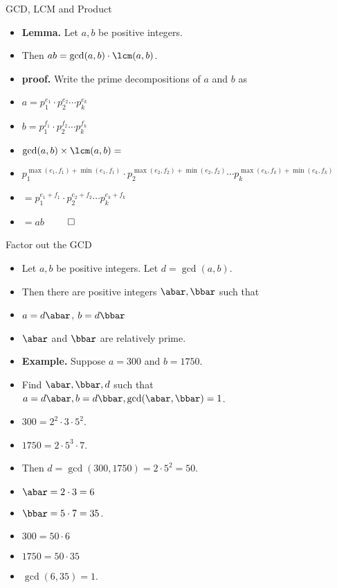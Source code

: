 \documentclass[handout]{beamer}
\begin{document}
\begin{frame}{GCD, LCM and Product}

\begin{itemize}
  \item \textbf{Lemma.} Let $a,b$ be positive integers.
  \item Then $ab = \gcd(a,b) \cdot \lcm(a,b)$.
  \item \textbf{proof.} Write the prime decompositions of $a$ and $b$ as
  \item $a=p_1^{e_1} \cdot p_2^{e_2} \cdots p_k^{e_k}$
  \item $b=p_1^{f_1} \cdot p_2^{f_2} \cdots p_k^{f_k}$
  \item $\gcd(a,b)\times \lcm(a,b) =$
  \item $p_1^{\max(e_1,f_1)+\min(e_1,f_1)} \cdot p_2^{\max(e_2,f_2)+\min(e_2,f_2)} \cdots p_k^{\max(e_k,f_k)+\min(e_k,f_k)}$
  \item $=p_1^{e_1+f_1} \cdot p_2^{e_2+f_2} \cdots p_k^{e_k+f_k}$
  \item $=ab$ $\qed$
\end{itemize}

\end{frame}

\begin{frame}{Factor out the GCD}

\begin{itemize}
  \item Let $a,b$ be positive integers. Let $d=\gcd(a,b)$.
  \item Then there are positive integers $\abar,\bbar$ such that
  \item $a=d\abar$, $b=d\bbar$
  \item $\abar$ and $\bbar$ are relatively prime.
  \item \textbf{Example.} Suppose $a=300$ and $b=1750$.
  \item Find $\abar,\bbar, d$ such that $a=d\abar, b=d\bbar, \gcd(\abar,\bbar)=1$.
  \item $300=2^2\cdot 3 \cdot 5^2$.
  \item $1750=2 \cdot 5^3 \cdot 7$.
  \item Then $d=\gcd(300,1750) = 2\cdot 5^2 = 50$.
  \item $\abar = 2\cdot 3 = 6$
  \item $\bbar = 5 \cdot 7 = 35$.
  \item $300 = 50 \cdot 6$
  \item $1750 = 50 \cdot 35$
  \item $\gcd(6,35) = 1$.
\end{itemize}

\end{frame}
\end{document}
